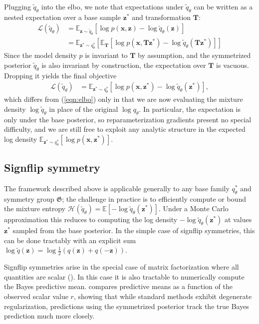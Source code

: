 \documentclass{article}
\newcommand{\E}{\mathbb{E}}
\newcommand{\G}{\mathfrak{G}}
\renewcommand{\v}[1]{\mathbf{#1}}
\newcommand{\elbo}{{\sc elbo}}
\begin{document}
Plugging $\tilde{q}_\theta$ into the \elbo, we note that
expectations under $\tilde{q}_\theta$ can be written as a nested expectation
over a base sample $\v{z}^*$ and transformation $\v{T}$:
\begin{align*}
\mathcal{L}(\tilde{q}_\theta) &= \E_{\v{z}\sim \tilde{q}_\theta}\left[\log p(\v{x}, \v{z}) - \log \tilde{q}_\theta(\v{z})\right]\\
&= \E_{\v{z}^*\sim q^*_\theta}\left[\E_\v{T}\left[\log p(\v{x}, \v{T}\v{z}^*) -
  \log \tilde{q}_\theta(\v{T}\v{z}^*)\right]\right]
\end{align*}
Since the model density $p$ is invariant to $\v{T}$ by assumption, and
the symmetrized posterior $\tilde{q}_\theta$ is also
invariant by construction, the expectation over $\v{T}$ is vacuous. Dropping it yields the
final objective
\begin{align}
\mathcal{L}(\tilde{q}_\theta) &= \E_{\v{z}^*\sim q^*_\theta}\left[\log p(\v{x}, \v{z}^*) - \log \tilde{q}_\theta(\v{z}^*)\right]\label{eqn:symmetrized_elbo},
\end{align}
which differs from (\ref{eqn:elbo}) only in that we are now
evaluating the mixture density $\log \tilde{q}_\theta$ in place of the
original $\log q_\theta$. In particular, the expectation is
only under the base posterior, so reparameterization
gradients present no special difficulty, and we are still free to
exploit any analytic structure in the expected log density $\E_{\v{z}^*\sim q^*_\theta}\left[\log p(\v{x}, \v{z}^*)\right]$. 

\subsection{Signflip symmetry}

The framework described above is applicable generally to any base
family $q^*_\theta$ and symmetry group $\G$; the challenge in practice is to efficiently
compute or bound the mixture entropy $\mathcal{H}(\tilde{q}_\theta) =
\E[-\log \tilde{q}_\theta(\v{z}^*)]$. Under a Monte Carlo approximation this
reduces to computing the log density $-\log \tilde{q}_\theta(\v{z}^*)$
at values $\v{z}^*$ sampled from the base posterior. In the simple case of signflip
symmetries, this can be done tractably with an explicit sum $\log
\tilde{q}(\v{z}) = \log \frac{1}{2}\left(q(\v{z}) + q(-\v{z})\right)$.

Signflip symmetries arise in the special case of matrix
factorization where all quantities are scalar
(). In this case it is also tractable to
numerically compute the Bayes predictive mean. 
compares predictive means as a function of the observed scalar value $r$, showing
that while standard methods exhibit degenerate regularization,
predictions using the symmetrized posterior track the true Bayes
prediction much more closely. 
\end{document}
